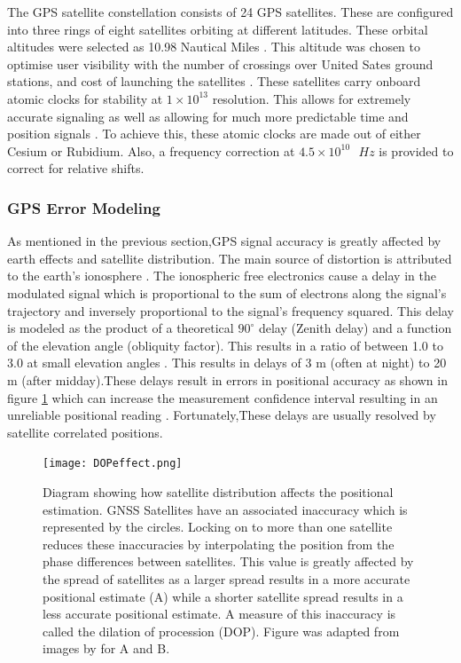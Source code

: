 The GPS satellite constellation consists of 24 GPS satellites. These are configured into three rings of eight satellites orbiting at different latitudes. These orbital altitudes were selected as 10.98 Nautical Miles \cite{spilker1996global}. This altitude was chosen to optimise user visibility with the number of crossings over United Sates ground stations, and cost of launching the satellites \cite{spilker1996global}. These satellites carry onboard atomic clocks for stability at $1\times10^{13}$ resolution. This allows for extremely accurate signaling as well as allowing for much more predictable time and position signals \cite{spilker1996global}. To achieve this, these atomic clocks are made out of either Cesium or Rubidium. Also, a frequency correction at $4.5\times10^{10} \text{ } Hz$ is provided to correct for relative shifts. \par

\subsubsection{GPS Error Modeling}

As mentioned in the previous section,GPS signal accuracy is greatly affected by earth effects and satellite distribution. The main source of distortion is attributed to the earth's ionosphere \cite{spilker1996global}. The ionospheric free electronics cause a delay in the modulated signal which is proportional to the sum of electrons along the signal's trajectory and inversely proportional to the signal's frequency squared. This delay is modeled as the product of a theoretical $90^\circ$ delay (Zenith delay) and a function of the elevation angle (obliquity factor). This results in a ratio of between 1.0 to 3.0 at small elevation angles \cite{spilker1996global}. This results in delays of 3 m (often at night) to 20 m (after midday).These delays result in errors in positional accuracy as shown in figure \ref{fig:DOP_effects} which can increase the measurement confidence interval resulting in an unreliable positional reading \cite{spilker1996global}. Fortunately,These delays are usually resolved by satellite correlated positions.

\begin{figure}[H]
	\centering
	\label{fig:DOP_effects}
	\texttt{[image: DOPeffect.png]}

	\caption{Diagram showing how satellite distribution affects the positional estimation. GNSS Satellites have an associated inaccuracy which is represented by the circles. Locking on to more than one satellite reduces these inaccuracies by interpolating the position from the phase differences between satellites. This value is greatly affected by the spread of satellites as a larger spread results in a more accurate positional estimate (A) while a shorter satellite spread results in a less accurate positional estimate. A measure of this inaccuracy is called the dilation of procession (DOP). Figure was adapted from images by \cite{GISGeo2020DOP} for A and B.}
\end{figure}

